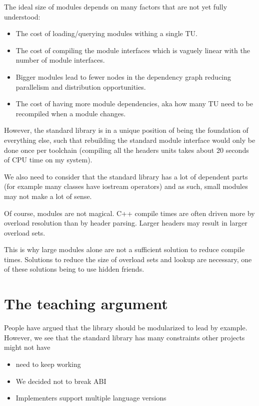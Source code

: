 \documentclass{wg21}
\begin{document}
The ideal size of modules depends on many factors that are not yet fully understood:

\begin{itemize}
\item The cost of loading/querying modules withing a single TU.
\item The cost of compiling the module interfaces which is vaguely linear with the number of module interfaces.
\item Bigger modules lead to fewer nodes in the dependency graph reducing parallelism and distribution opportunities.
\item The cost of having more module dependencies, aka how many TU need to be recompiled when a module changes.
\end{itemize}

However, the standard library is in a unique position of being the foundation of everything else, such that rebuilding
the standard module interface would only be done once per toolchain (compiling all the headers units takes about 20 seconds of CPU time on my system).

We also need to consider that the standard library has a lot of dependent parts (for example many classes have iostream operators) and as such, small modules may not make a lot of sense.

Of course, modules are not magical. C++ compile times are often driven more by overload resolution than by header parsing.
Larger headers may result in larger overload sets.

This is why large modules alone are not a sufficient solution to reduce compile times.
Solutions to reduce the size of overload sets and lookup are necessary, one of these solutions being to use hidden friends.


\section{The teaching argument}

People have argued that the library should be modularized to lead by example.
However, we see that the standard library has many constraints other projects might not have

\begin{itemize}
 \item {} need to keep working
 \item We decided not to break ABI
 \item Implementers support multiple language versions
\end{itemize}
\end{document}
